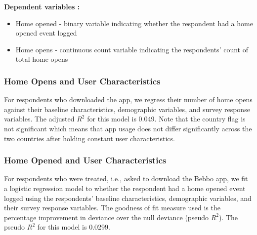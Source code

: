 \documentclass{article}
\begin{document}
\textbf{Dependent variables :}
\begin{itemize}
    \item Home opened - binary variable indicating whether the respondent had a home opened event logged
    \item Home opens - continuous count variable indicating the respondents' count of total home opens
\end{itemize}
    
\subsubsection*{Home Opens and User Characteristics}
For respondents who downloaded the app, we regress their number of home opens against their baseline characteristics, demographic variables, and survey response variables. The adjusted $R^{2}$ for this model is 0.049. Note that the country flag is not significant which means that app usage does not differ significantly across the two countries after holding constant user characteristics.


\subsubsection*{Home Opened and User Characteristics}
For respondents who were treated, i.e., asked to download the Bebbo app, we fit a logistic regression model to whether the respondent had a home opened event logged using the respondents' baseline characteristics, demographic variables, and their survey response variables. The goodness of fit measure used is the percentage improvement in deviance over the null deviance (pseudo $R^{2}$). The pseudo $R^{2}$ for this model is 0.0299.

\end{document}
